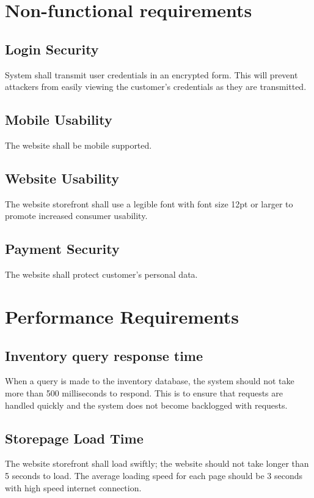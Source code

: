 \documentclass{scrreprt}
\theoremstyle{funreq}
\begin{document}
	\section{Non-functional requirements}
	\subsection{Login Security}
	System shall transmit user credentials in an encrypted form.  This will prevent attackers from easily viewing the customer's credentials as they are transmitted.  
	
    \subsection{Mobile Usability}
	The website shall be mobile supported.

    \subsection{Website Usability}
    The website storefront shall use a legible font with font size 12pt or larger to promote increased consumer usability.

    \subsection{Payment Security}
    The website shall protect customer’s personal data.

	\section{Performance Requirements}
	\subsection{Inventory query response time}
	When a query is made to the inventory database, the system should not take more than 500 milliseconds to respond.  This is to ensure that requests are handled quickly and the system does not become backlogged with requests.
	
	\subsection{Storepage Load Time}
	The website storefront shall load swiftly; the website should not take longer than 5 seconds to load. The average loading speed for each page should be 3 seconds with high speed internet connection.
	
\end{document}
